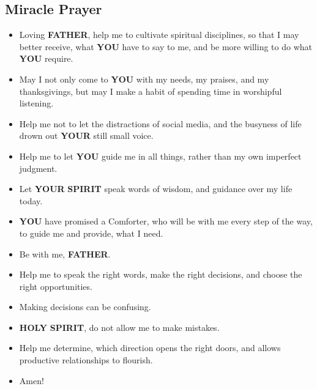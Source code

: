\documentclass[12pt,a5paper]{article}
\newcommand{\Father}[0]{\textbf{FATHER}}
\newcommand{\Holy}[0]{\textbf{HOLY}}
\newcommand{\Spirit}[0]{\textbf{SPIRIT}}
\newcommand{\You}[0]{\textbf{YOU}}
\newcommand{\Your}[0]{\textbf{YOUR}}
\begin{document}
	\subsection{Miracle Prayer}
		\begin{itemize}[nosep]
			\item	Loving {\Father},
					help me to cultivate spiritual disciplines,
					so that I may better receive,
					what {\You} have to say to me,
					and be more willing to do what {\You} require.
			\item	May I not only come to {\You} with my needs,
					my praises,
					and my thanksgivings,
					but may I make a habit of spending time in worshipful listening.
			\item	Help me not to let the distractions of social media,
					and the busyness of life drown out {\Your} still small voice.
			\item	Help me to let {\You} guide me in all things,
					rather than my own imperfect judgment.
			\item	Let {\Your} {\Spirit} speak words of wisdom,
					and guidance over my life today.
			\item	{\You} have promised a Comforter,
					who will be with me every step of the way,
					to guide me and provide,
					what I need.
			\item	Be with me,
					{\Father}.
			\item	Help me to speak the right words,
					make the right decisions,
					and choose the right opportunities.
			\item	Making decisions can be confusing.
			\item	{\Holy} {\Spirit},
					do not allow me to make mistakes.
			\item	Help me determine,
					which direction opens the right doors,
					and allows productive relationships to flourish.
			\item	Amen!
		\end{itemize}
		
\end{document}
